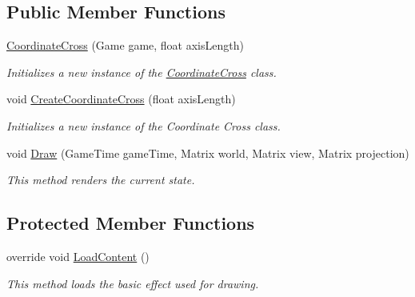 \subsection*{Public Member Functions}
\begin{DoxyCompactItemize}
\item 
\hyperlink{class_microsoft_1_1_samples_1_1_kinect_1_1_avateering_1_1_coordinate_cross_a00b5eceee82d2b5bb39f8c7fcd3ea6c1}{Coordinate\+Cross} (Game game, float axis\+Length)
\begin{DoxyCompactList}\small\item\em Initializes a new instance of the \hyperlink{class_microsoft_1_1_samples_1_1_kinect_1_1_avateering_1_1_coordinate_cross}{Coordinate\+Cross} class. \end{DoxyCompactList}\item 
void \hyperlink{class_microsoft_1_1_samples_1_1_kinect_1_1_avateering_1_1_coordinate_cross_ada52632b099522d552c848487a448b4e}{Create\+Coordinate\+Cross} (float axis\+Length)
\begin{DoxyCompactList}\small\item\em Initializes a new instance of the Coordinate Cross class. \end{DoxyCompactList}\item 
void \hyperlink{class_microsoft_1_1_samples_1_1_kinect_1_1_avateering_1_1_coordinate_cross_acb449d7ad4361a931588dd7568c30457}{Draw} (Game\+Time game\+Time, Matrix world, Matrix view, Matrix projection)
\begin{DoxyCompactList}\small\item\em This method renders the current state. \end{DoxyCompactList}\end{DoxyCompactItemize}
\subsection*{Protected Member Functions}
\begin{DoxyCompactItemize}
\item 
override void \hyperlink{class_microsoft_1_1_samples_1_1_kinect_1_1_avateering_1_1_coordinate_cross_a5191669216fb474d855e29bd8e9bb187}{Load\+Content} ()
\begin{DoxyCompactList}\small\item\em This method loads the basic effect used for drawing. \end{DoxyCompactList}\end{DoxyCompactItemize}


